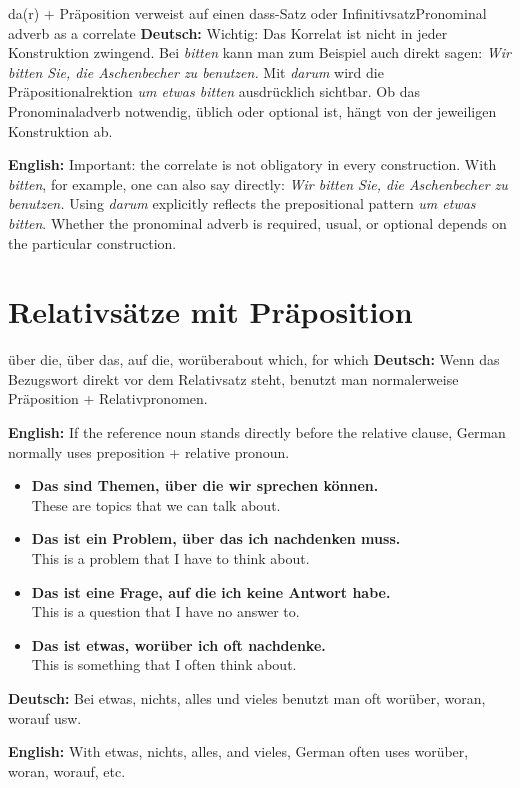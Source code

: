 \documentclass[a4paper,11pt]{article}
\newcommand{\GermanText}[1]{\textbf{Deutsch: }#1\par}
\newcommand{\EnglishText}[1]{{\small\color{SoftGray}\textbf{English: }#1\par}}
\newcommand{\ExampleItem}[2]{\item \textbf{#1}\\{\small\color{SoftGray}#2}}
\begin{document}
\begin{grammarentry}{da(r) + Präposition verweist auf einen dass-Satz oder Infinitivsatz}{Pronominal adverb as a correlate}
            \GermanText{Wichtig: Das Korrelat ist nicht in jeder Konstruktion zwingend. Bei \emph{bitten} kann man zum Beispiel auch direkt sagen: \emph{Wir bitten Sie, die Aschenbecher zu benutzen.} Mit \emph{darum} wird die Präpositionalrektion \emph{um etwas bitten} ausdrücklich sichtbar. Ob das Pronominaladverb notwendig, üblich oder optional ist, hängt von der jeweiligen Konstruktion ab.}
            \EnglishText{Important: the correlate is not obligatory in every construction. With \emph{bitten}, for example, one can also say directly: \emph{Wir bitten Sie, die Aschenbecher zu benutzen.} Using \emph{darum} explicitly reflects the prepositional pattern \emph{um etwas bitten}. Whether the pronominal adverb is required, usual, or optional depends on the particular construction.}
        \end{grammarentry}
    
    
    \section{Relativsätze mit Präposition}
        
        \begin{grammarentry}{über die, über das, auf die, worüber}{about which, for which}
            \GermanText{Wenn das Bezugswort direkt vor dem Relativsatz steht, benutzt man normalerweise Präposition + Relativpronomen.}
            \EnglishText{If the reference noun stands directly before the relative clause, German normally uses preposition + relative pronoun.}
            
            \begin{exbox}
                \begin{itemize}
                    \ExampleItem{Das sind Themen, über die wir sprechen können.}{These are topics that we can talk about.}
                    \ExampleItem{Das ist ein Problem, über das ich nachdenken muss.}{This is a problem that I have to think about.}
                    \ExampleItem{Das ist eine Frage, auf die ich keine Antwort habe.}{This is a question that I have no answer to.}
                    \ExampleItem{Das ist etwas, worüber ich oft nachdenke.}{This is something that I often think about.}
                \end{itemize}
            \end{exbox}
            
            \GermanText{Bei etwas, nichts, alles und vieles benutzt man oft worüber, woran, worauf usw.}
            \EnglishText{With etwas, nichts, alles, and vieles, German often uses worüber, woran, worauf, etc.}
        \end{grammarentry}
    
\end{document}
